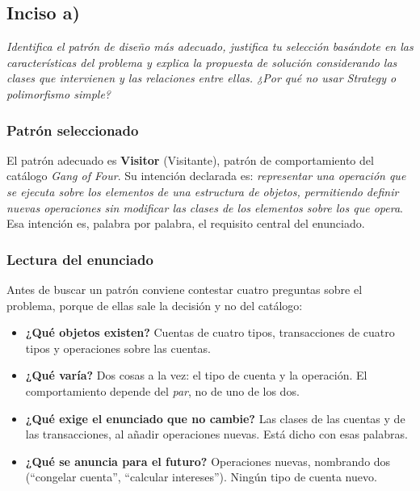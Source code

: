 {}
\subsection*{Inciso a)}

\textit{Identifica el patrón de diseño más adecuado, justifica tu selección basándote en las
características del problema y explica la propuesta de solución considerando las clases que
intervienen y las relaciones entre ellas. ¿Por qué no usar Strategy o polimorfismo simple?}

\vspace{0.4cm}

\subsubsection*{Patrón seleccionado}

El patrón adecuado es \textbf{Visitor} (Visitante), patrón de comportamiento del catálogo
\textit{Gang of Four}. Su intención declarada es: \textit{representar una operación que se
ejecuta sobre los elementos de una estructura de objetos, permitiendo definir nuevas operaciones
sin modificar las clases de los elementos sobre los que opera}. Esa intención es, palabra por
palabra, el requisito central del enunciado.

\subsubsection*{Lectura del enunciado}

Antes de buscar un patrón conviene contestar cuatro preguntas sobre el problema, porque de
ellas sale la decisión y no del catálogo:

\begin{itemize}[leftmargin=1.2cm]
    \item \textbf{¿Qué objetos existen?} Cuentas de cuatro tipos, transacciones de cuatro
          tipos y operaciones sobre las cuentas.
    \item \textbf{¿Qué varía?} Dos cosas a la vez: el tipo de cuenta y la operación. El
          comportamiento depende del \emph{par}, no de uno de los dos.
    \item \textbf{¿Qué exige el enunciado que no cambie?} Las clases de las cuentas y de las
          transacciones, al añadir operaciones nuevas. Está dicho con esas palabras.
    \item \textbf{¿Qué se anuncia para el futuro?} Operaciones nuevas, nombrando dos
          (``congelar cuenta'', ``calcular intereses''). Ningún tipo de cuenta nuevo.
\end{itemize}

